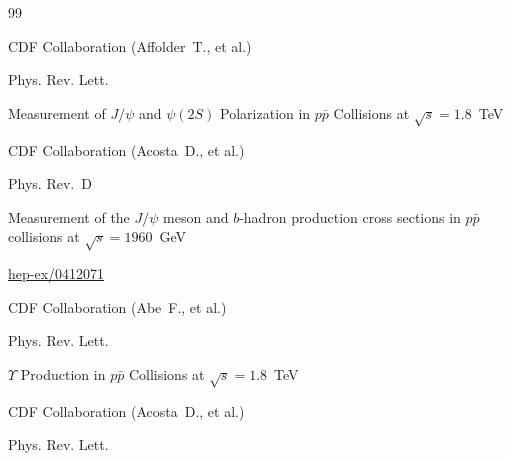 \begin{thebibliography}{99}


\by CDF Collaboration (Affolder~T., et al.)

\jour Phys. Rev. Lett.





\paper Measurement of $J/\psi$ and $\psi(2S)$ Polarization in $p\bar p$  Collisions at $\sqrt s=1.8$~TeV







\by  CDF Collaboration (Acosta~D., et al.)

\jour  Phys.  Rev.~D 





\paper Measurement of the $J/\psi$ meson and $b$-hadron production cross sections in $p \bar p$  collisions at $\sqrt s=1960$~GeV

\arxiv \href{http://arxiv.org/abs/hep-ex/0412071}{hep-ex/0412071}







\by  CDF Collaboration (Abe~F.,  et al.)

\jour Phys.  Rev.  Lett.





\paper $\Upsilon$ Production in $p\bar p$ Collisions at $\sqrt s =1.8$~TeV







\by CDF Collaboration (Acosta~D.,  et al.)

\jour Phys.  Rev.  Lett.



\end{thebibliography}
